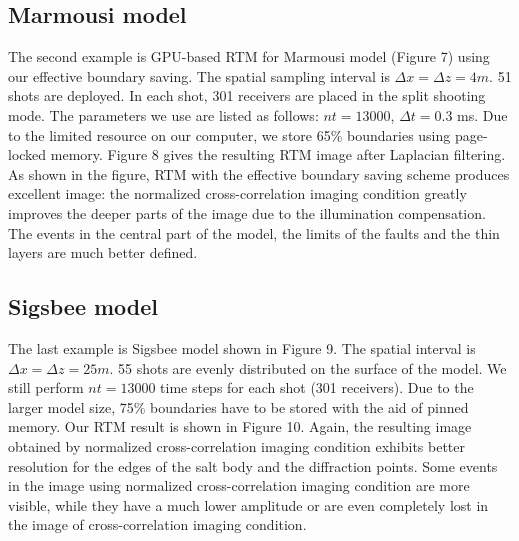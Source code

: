 
\subsection{Marmousi model}

The second example is GPU-based RTM for Marmousi model (Figure 7) using our effective boundary saving. The spatial sampling interval is $\Delta x=\Delta z=4m$. 51 shots are deployed. In each shot, 301 receivers are placed in the split shooting mode. The parameters we use are listed as follows: $nt=13000$, $\Delta t=0.3$ ms. Due to the limited resource on our computer, we store 65\% boundaries using page-locked memory. Figure 8 gives the resulting RTM image after Laplacian filtering. As shown in the figure, RTM with the effective boundary saving scheme produces excellent image: the normalized cross-correlation imaging condition greatly improves the deeper parts of the image due to the illumination compensation. The events in the central part of the model, the limits of the faults and the thin layers are much better defined.



\subsection{Sigsbee model}

The last example is Sigsbee model shown in Figure 9. The spatial interval is  $\Delta x=\Delta z=25m$. 55 shots are evenly distributed on the surface of the model. We still perform $nt=13000$ time steps for each shot (301 receivers). Due to the larger model size, 75\% boundaries have to be stored with the aid of pinned memory. Our RTM result is shown in Figure 10. Again, the resulting image obtained by normalized cross-correlation imaging condition exhibits better resolution for the edges of the salt body and the diffraction points. Some events in the image using normalized cross-correlation imaging condition are more visible, while they have a much lower amplitude or are even completely lost in the image of cross-correlation imaging condition.


